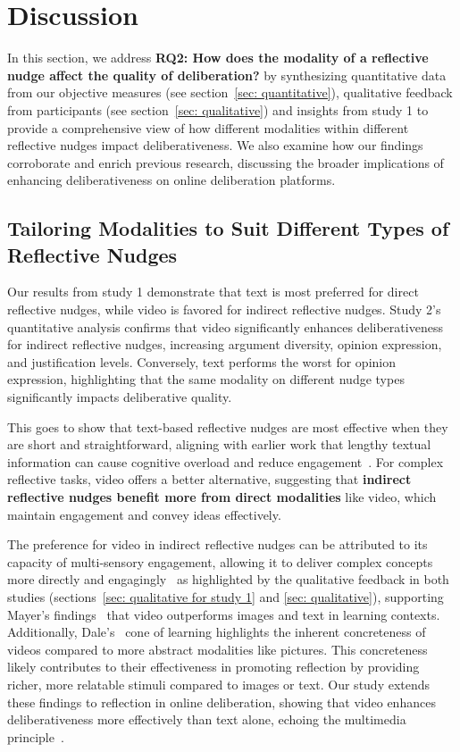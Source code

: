 \section{Discussion}
In this section, we address \textbf{RQ2: How does the modality of a reflective nudge affect the quality of deliberation?} by synthesizing quantitative data from our objective measures (see section~\ref{sec: quantitative}), qualitative feedback from participants (see section~\ref{sec: qualitative}) and insights from study 1 to provide a comprehensive view of how different modalities within different reflective nudges impact deliberativeness. We also examine how our findings corroborate and enrich previous research, discussing the broader implications of enhancing deliberativeness on online deliberation platforms.

\subsection{Tailoring Modalities to Suit Different Types of Reflective Nudges}
Our results from study 1 demonstrate that text is most preferred for direct reflective nudges, while video is favored for indirect reflective nudges. Study 2's quantitative analysis confirms that video significantly enhances deliberativeness for indirect reflective nudges, increasing argument diversity, opinion expression, and justification levels. Conversely, text performs the worst for opinion expression, highlighting that the same modality on different nudge types significantly impacts deliberative quality.

This goes to show that text-based reflective nudges are most effective when they are short and straightforward, aligning with earlier work that lengthy textual information can cause cognitive overload and reduce engagement~\cite{sweller1988cognitive}. For complex reflective tasks, video offers a better alternative, suggesting that \textbf{indirect reflective nudges benefit more from direct modalities} like video, which maintain engagement and convey ideas effectively.

The preference for video in indirect reflective nudges can be attributed to its capacity of multi-sensory engagement, allowing it to deliver complex concepts more directly and engagingly~\cite{clark2023learning} as highlighted by the qualitative feedback in both studies (sections~\ref{sec: qualitative for study 1} and \ref{sec: qualitative}), supporting Mayer’s findings~\cite{mayer2005cambridge} that video outperforms images and text in learning contexts. Additionally, Dale’s~\cite{dale1969audiovisual} cone of learning highlights the inherent concreteness of videos compared to more abstract modalities like pictures. This concreteness likely contributes to their effectiveness in promoting reflection by providing richer, more relatable stimuli compared to images or text. Our study extends these findings to reflection in online deliberation, showing that video enhances deliberativeness more effectively than text alone, echoing the multimedia principle~\cite{fletcher2005multimedia}.

